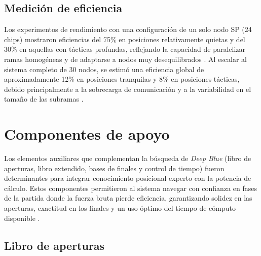 \documentclass[a4paper, 12pt]{article}
\begin{document}
\subsection{Medición de eficiencia}

Los experimentos de rendimiento con una configuración de un solo 
nodo SP (24 chips) mostraron eficiencias del 75\% en posiciones 
relativamente quietas y del 30\% en aquellas con tácticas 
profundas, reflejando la capacidad de paralelizar ramas 
homogéneas y de adaptarse a nodos muy desequilibrados 
\cite{campbell2002deep}. Al escalar al sistema completo de 30 nodos, 
se estimó una eficiencia global de aproximadamente 12\% en 
posiciones tranquilas y 8\% en posiciones tácticas, debido 
principalmente a la sobrecarga de comunicación y a la 
variabilidad en el tamaño de las subramas \cite{campbell2002deep}.




















\section{Componentes de apoyo}

Los elementos auxiliares que complementan la búsqueda de 
\textit{Deep Blue} (libro de aperturas, libro extendido, 
bases de finales y control de tiempo) fueron determinantes para 
integrar conocimiento posicional experto con la potencia de 
cálculo. Estos componentes permitieron al sistema navegar con 
confianza en fases de la partida donde la fuerza bruta pierde 
eficiencia, garantizando solidez en las aperturas, exactitud en 
los finales y un uso óptimo del tiempo de cómputo disponible 
\cite{campbell2002deep}.


\subsection{Libro de aperturas}
\end{document}
